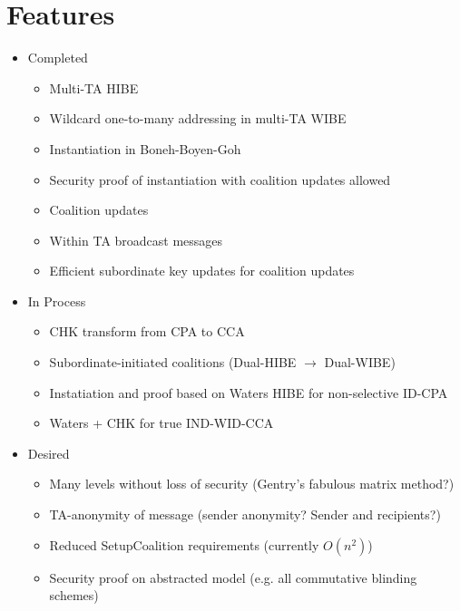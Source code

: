 \documentclass[10pt]{llncs}
\begin{document}
\section{Features}
\begin{itemize}
	\item Completed
	\begin{itemize}
		\item Multi-TA HIBE
		\item Wildcard one-to-many addressing in multi-TA WIBE
		\item Instantiation in Boneh-Boyen-Goh
		\item Security proof of instantiation with coalition updates allowed
		\item Coalition updates
		\item Within TA broadcast messages
		\item Efficient subordinate key updates for coalition updates
	\end{itemize}
	\item In Process
	\begin{itemize}
		\item CHK transform from CPA to CCA
		\item Subordinate-initiated coalitions (Dual-HIBE $\rightarrow$ Dual-WIBE)
		\item Instatiation and proof based on Waters HIBE for non-selective ID-CPA
		\item Waters + CHK for true IND-WID-CCA
	\end{itemize}
	\item Desired
	\begin{itemize}
		\item Many levels without loss of security (Gentry's fabulous matrix method?)
		\item TA-anonymity of message (sender anonymity? Sender and recipients?)
		\item Reduced SetupCoalition requirements (currently $O(n^2)$)
		\item Security proof on abstracted model (e.g. all commutative blinding schemes)
	\end{itemize}
\end{itemize}
\end{document}
